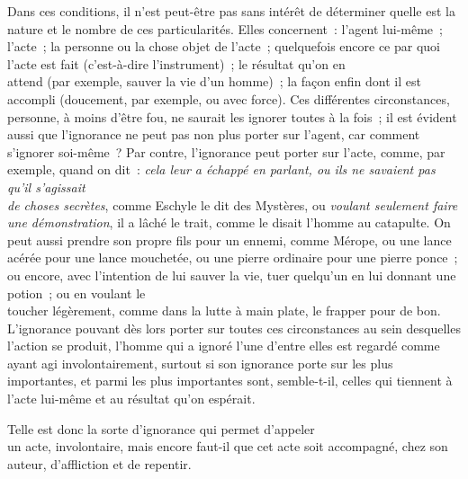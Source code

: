 \documentclass[french,twoside]{book} %
\begin{document}
Dans ces conditions, il n’est peut-être pas sans intérêt de déterminer quelle est la nature et le nombre de ces particularités. Elles concernent : l’agent lui-même ; l’acte ; la personne ou la chose objet de l’acte ; quelquefois encore ce par quoi l’acte est fait (c’est-à-dire l’instrument) ; le résultat qu’on en \\
attend (par exemple, sauver la vie d’un homme) ; la façon enfin dont il est accompli (doucement, par exemple, ou avec force). Ces différentes circonstances, personne, à moins d’être fou, ne saurait les ignorer toutes à la fois ; il est évident aussi que l’ignorance ne peut pas non plus porter sur l’agent, car comment s’ignorer soi-même ? Par contre, l’ignorance peut porter sur l’acte, comme, par exemple, quand on dit : {\itshape cela leur a échappé en parlant, ou ils ne savaient pas qu’il s’agissait} \\
{\itshape de choses secrètes}, comme Eschyle le dit des Mystères, ou {\itshape voulant seulement faire une démonstration}, il a lâché le trait, comme le disait l’homme au catapulte. On peut aussi prendre son propre fils pour un ennemi, comme Mérope, ou une lance acérée pour une lance mouchetée, ou une pierre ordinaire pour une pierre ponce ; ou encore, avec l’intention de lui sauver la vie, tuer quelqu’un en lui donnant une potion ; ou en voulant le \\
toucher légèrement, comme dans la lutte à main plate, le frapper pour de bon. L’ignorance pouvant dès lors porter sur toutes ces circonstances au sein desquelles l’action se produit, l’homme qui a ignoré l’une d’entre elles est regardé comme ayant agi involontairement, surtout si son ignorance porte sur les plus importantes, et parmi les plus importantes sont, semble-t-il, celles qui tiennent à l’acte lui-même et au résultat qu’on espérait.\par
Telle est donc la sorte d’ignorance qui permet d’appeler \\
un acte, involontaire, mais encore faut-il que cet acte soit accompagné, chez son auteur, d’affliction et de repentir.
\end{document}
